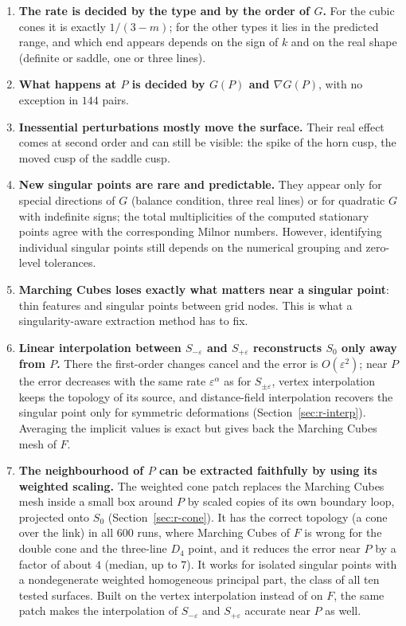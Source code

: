 \documentclass[12pt, a4paper]{article}
\theoremstyle{plain}
\theoremstyle{definition}
\theoremstyle{remark}
\theoremstyle{definition}
\begin{document}
\begin{enumerate}
    \item \textbf{The rate is decided by the type and by the order of $G$.} For the
          cubic cones it is exactly $1/(3-m)$; for the other types it lies in the
          predicted range, and which end appears depends on the sign of $k$ and on
          the real shape (definite or saddle, one or three lines).
    \item \textbf{What happens at $P$ is decided by $G(P)$ and $\nabla G(P)$}, with
          no exception in $144$ pairs.
    \item \textbf{Inessential perturbations mostly move the surface.} Their real
          effect comes at second order and can still be visible: the spike of the
          horn cusp, the moved cusp of the saddle cusp.
    \item \textbf{New singular points are rare and predictable.} They appear only
          for special directions of $G$ (balance condition, three real lines) or for
          quadratic $G$ with indefinite signs; the total multiplicities of the computed stationary
            points agree with the corresponding Milnor numbers.
            However, identifying individual singular points still
            depends on the numerical grouping and zero-level tolerances.
    \item \textbf{Marching Cubes loses exactly what matters near a singular point}:
          thin features and singular points between grid nodes. This is what a
          singularity-aware extraction method has to fix.
    \item \textbf{Linear interpolation between $S_{-\varepsilon}$ and
          $S_{+\varepsilon}$ reconstructs $S_0$ only away from $P$.} There the
          first-order changes cancel and the error is $O(\varepsilon^2)$; near
          $P$ the error decreases with the same rate $\varepsilon^\alpha$ as for
          $S_{\pm\varepsilon}$, vertex interpolation keeps the topology of its
          source, and distance-field interpolation recovers the singular point only
          for symmetric deformations (Section~\ref{sec:r-interp}). Averaging the
          implicit values is exact but gives back the Marching Cubes mesh of $F$.
    \item \textbf{The neighbourhood of $P$ can be extracted faithfully by using its
          weighted scaling.} The weighted cone patch replaces the Marching Cubes
          mesh inside a small box around $P$ by scaled copies of its own boundary
          loop, projected onto $S_0$ (Section~\ref{sec:r-cone}). It has the correct
          topology (a cone over the link) in all $600$ runs, where Marching Cubes
          of $F$ is wrong for the double cone and the three-line $D_4$ point, and
          it reduces the error near $P$ by a factor of about $4$ (median, up to $7$).
          It works for isolated singular points with a nondegenerate weighted
          homogeneous principal part, the class of all ten tested surfaces. Built on
          the vertex interpolation instead of on $F$, the same patch makes the
          interpolation of $S_{-\varepsilon}$ and $S_{+\varepsilon}$ accurate near $P$
          as well.
\end{enumerate}
\end{document}

